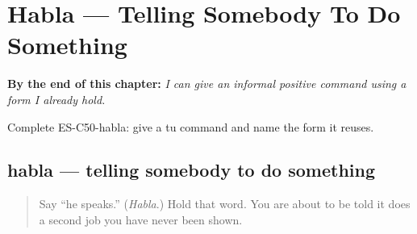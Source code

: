 
\chapter{Habla --- Telling Somebody To Do Something}
\label{ch:command-tu}

\begin{chapteropening}
\textbf{By the end of this chapter:} \emph{I can give an informal positive command using a form I already hold.}

Complete ES-C50-habla: give a tu command and name the form it reuses.
\end{chapteropening}

\section[habla · come · vive]{habla — telling somebody to do something}

\label{lesson:ES-C50-habla}



\begin{quote}
Say \textquotedblleft{}he speaks.\textquotedblright{} (\emph{Habla}.) Hold that word. You are about to be told it does a second job you have never been shown.
\end{quote}

